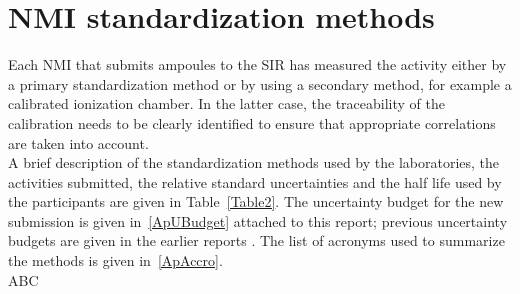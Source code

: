 \documentclass[12pt]{iopart}
\begin{document}
\section{NMI standardization methods}

Each NMI that submits ampoules to the SIR has measured the activity either by a primary standardization method or by using a secondary method, for example a calibrated ionization chamber. In the latter case, the traceability of the calibration needs to be clearly identified to ensure that appropriate correlations are taken into account.\\ 

A brief description of the standardization methods used by the laboratories, the activities submitted, the relative standard uncertainties and the half life used by the participants are given in Table~\ref{Table2}. The uncertainty budget for the new submission is given in~\ref{ApUBudget} attached to this report; previous uncertainty budgets are given in the earlier reports \cite{KCRV_2021,KCRV_2022}. The list of acronyms used to summarize the methods is given in~\ref{ApAccro}.\\ 

ABC
\end{document}
